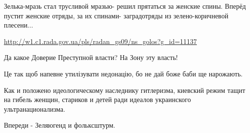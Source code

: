 \begin{itemize}
Зелька-мразь стал трусливой мразью- решил прятаться за женские спины.
Вперёд пустит женские отряды, за их спинами- заградотряды из зелено-коричневой плесени...

\url{http://w1.c1.rada.gov.ua/pls/radan_gs09/ns_golos?g_id=11137}

Да какое Доверие Преступной власти? На Зону эту власть!

Це так щоб напевне утилізувати недонацію, бо не дай боже баби ще нарожають.


Как и положено идеологическому наследнику гитлеризма, киевский режим тащит на
гибель женщин, стариков и детей ради идеалов украинского ультранационализма.

Впереди - Зеляюгенд и фольксштурм.

\end{itemize} %
